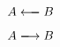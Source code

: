 \documentclass{article}
\begin{document}
\[ A \xlongleftarrow[]{} B \]
\[ A \xlongrightarrow{} B \]
\end{document}
